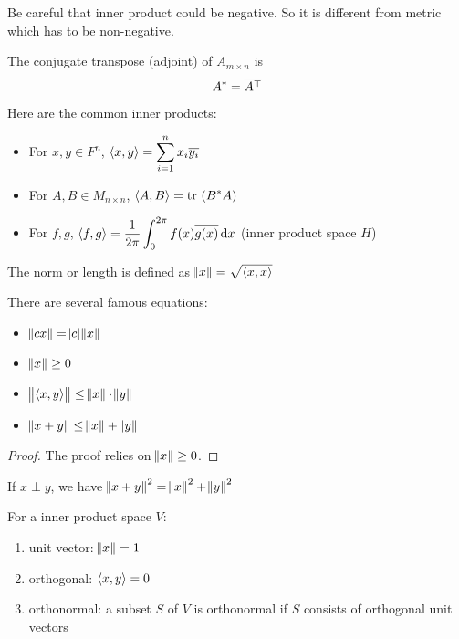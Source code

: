 Be careful that inner product could be negative. So it is different from metric which has to be non-negative.

\begin{definition}
    The conjugate transpose (adjoint) of $A_{m \times n}$ is 
    \begin{equation}
        A^* = \overline{{A}^\top}
    \end{equation}
\end{definition}

Here are the common inner products:
\begin{itemize}
    \item For $x,y \in F^n$, $\displaystyle \left\langle \displaystyle x, y \right\rangle = \sum_{i=1}^n x_i \overline{y_i}$
    \item For $A,B \in M_{n \times n}$, $\left\langle \displaystyle A, B \right\rangle = \displaystyle \mathrm{tr}~( B^* A )$
    \item For $f,g$, $\displaystyle \innerproduct{f}{g} = \frac{1}{2 \pi} \int_{0}^{2\pi} f(x) \conjugate{g(x)} \dif x$ (inner product space $H$)
\end{itemize}


The norm or length is defined as $\norm{x} = \sqrt{\left\langle \displaystyle x, x \right\rangle}$

There are several famous equations:
\begin{itemize}
    \item $\norm{cx} = \abs{c} \norm{x}$
    \item $\norm{x} \geq 0$
    \item $\norm{\left\langle \displaystyle x, y \right\rangle} \leq \norm{x} \cdot \norm{y}$
    \item $\norm{x+y} \leq \norm{x} + \norm{y}$
\end{itemize}
\begin{proof}
    The proof relies on $\norm{x} \geq 0$.
\end{proof}


If $x \perp y$, we have $\norm{x+y}^2 = \norm{x}^2 + \norm{y}^2$


\begin{definition}
    For a inner product space $V$:
    \begin{enumerate}
        \item unit vector: $\norm{x} =1$
        \item orthogonal: $\left\langle \displaystyle x, y \right\rangle = 0$
        \item orthonormal: a subset $S$ of $V$ is orthonormal if $S$ consists of orthogonal unit vectors
    \end{enumerate}
\end{definition}

